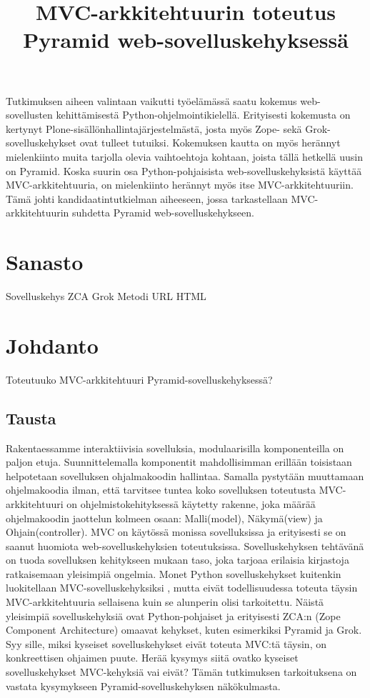 \documentclass[finnish,utf8,nonumbib,palatino,kandi]{gradu2}
\title{MVC-arkkitehtuurin toteutus Pyramid web-sovelluskehyksessä}
\begin{document}
\preface

Tutkimuksen aiheen valintaan vaikutti työelämässä saatu
 kokemus web-sovellusten kehittämisestä Python-ohjelmointikielellä. Erityisesti
kokemusta on kertynyt Plone-sisällönhallintajärjestelmästä, josta myös Zope- sekä
Grok-sovelluskehykset ovat tulleet tutuiksi. Kokemuksen kautta on myös herännyt mielenkiinto
muita tarjolla olevia vaihtoehtoja kohtaan, joista tällä hetkellä uusin on Pyramid. Koska suurin osa Python-pohjaisista
web-sovelluskehyksistä käyttää MVC-arkkitehtuuria, on mielenkiinto herännyt myös itse MVC-arkkitehtuuriin. Tämä johti
kandidaatintutkielman aiheeseen, jossa tarkastellaan MVC-arkkitehtuurin suhdetta Pyramid web-sovelluskehykseen.

\mainmatter
\section{Sanasto}
Sovelluskehys
ZCA
Grok
Metodi
URL
HTML



\section{Johdanto}
Toteutuuko MVC-arkkitehtuuri Pyramid-sovelluskehyksessä?

\subsection{Tausta}
Rakentaessamme interaktiivisia sovelluksia, modulaarisilla komponenteilla on paljon etuja. Suunnittelemalla komponentit mahdollisimman erillään toisistaan helpotetaan
sovelluksen ohjalmakoodin hallintaa. Samalla pystytään muuttamaan ohjelmakoodia ilman, että tarvitsee tuntea koko sovelluksen toteutusta \cite[s.2]{Krasner:desc}
MVC-arkkitehtuuri on ohjelmistokehityksessä käytetty rakenne, joka määrää ohjelmakoodin jaottelun kolmeen osaan: Malli(model), Näkymä(view) ja Ohjain(controller). MVC on käytössä monissa sovelluksissa ja erityisesti se on saanut
huomiota web-sovelluskehyksien toteutuksissa. Sovelluskehyksen tehtävänä on tuoda sovelluksen kehitykseen mukaan
taso, joka tarjoaa erilaisia kirjastoja ratkaisemaan yleisimpiä ongelmia. Monet Python sovelluskehykset kuitenkin luokitellaan MVC-sovelluskehyksiksi \cite{mvcframeworks}, mutta eivät
todellisuudessa toteuta täysin MVC-arkkitehtuuria sellaisena kuin se alunperin olisi tarkoitettu. Näistä yleisimpiä sovelluskehyksiä ovat Python-pohjaiset
ja erityisesti ZCA:n (Zope Component Architecture) omaavat kehykset, kuten esimerkiksi Pyramid ja Grok. Syy sille, miksi
kyseiset sovelluskehykset eivät toteuta MVC:tä täysin, on konkreettisen ohjaimen puute.
Herää kysymys siitä ovatko kyseiset sovelluskehykset MVC-kehyksiä vai eivät? Tämän tutkimuksen tarkoituksena on vastata kysymykseen Pyramid-sovelluskehyksen näkökulmasta.
\end{document}
